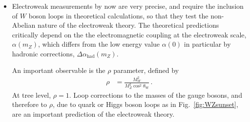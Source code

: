 \documentclass[12pt]{report}
\newcommand{\2}{\ensuremath{\sqrt{2}\,}}
\begin{document}
{\begin{itemize}
        \item Electroweak measurements by now are very precise, and require the inclusion of
          $W$ boson loops in theoretical calculations, so that they test the non-Abelian nature
          of the electroweak theory. The theoretical predictions critically depend on the
          the electromagnetic coupling at the electroweak scale, $\alpha(m_Z)$, which differs
          from the low energy value $\alpha(0)$ in particular by hadronic corrections,
          $\Delta\alpha_\text{had}(m_Z)$.
          
          An important observable is the $\rho$
           parameter, defined by
          \begin{align}
            \rho&= \frac{M_W^2}{M_Z^2 \cos^2\theta_\text{W}}\,.
          \end{align}
          At tree level, $\rho=1$. Loop corrections to the masses of the gauge
          bosons, and therefore to $\rho$, due to quark or Higgs boson loops as in Fig.~\ref{fig:WZsunset},
          are an important prediction of the electroweak theory.


\end{itemize}}
\end{document}
